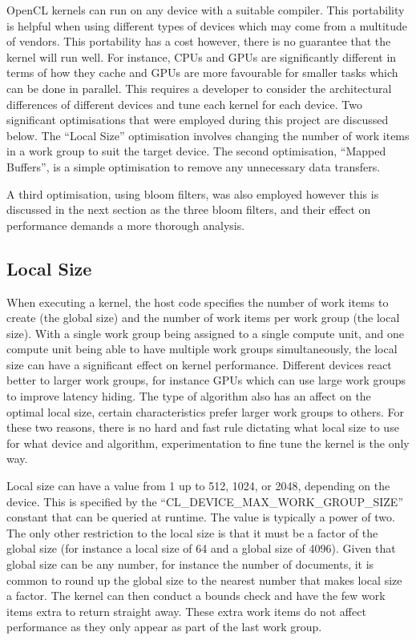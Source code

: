 OpenCL kernels can run on any device with a suitable compiler. This portability
is helpful when using different types of devices which may come from a multitude
of vendors. This portability has a cost however, there is no guarantee that the
kernel will run well. For instance, CPUs and GPUs are significantly different in
terms of how they cache and GPUs are more favourable for smaller tasks which can
be done in parallel. This requires a developer to consider the architectural
differences of different devices and tune each kernel for each device. Two
significant optimisations that were employed during this project are discussed
below. The ``Local Size'' optimisation involves changing the number of work
items in a work group to suit the target device. The second optimisation,
``Mapped Buffers'', is a simple optimisation to remove any unnecessary data
transfers.

A third optimisation, using bloom filters, was also employed however this is
discussed in the next section as the three bloom filters, and their effect on
performance demands a more thorough analysis.

\subsection{Local Size}

When executing a kernel, the host code specifies the number of work items to
create (the global size) and the number of work items per work group (the local
size). With a single work group being assigned to a single compute unit, and one
compute unit being able to have multiple work groups simultaneously, the local
size can have a significant effect on kernel performance. Different devices
react better to larger work groups, for instance GPUs which can use large work
groups to improve latency hiding. The type of algorithm also has an affect on
the optimal local size, certain characteristics prefer larger work groups to
others. For these two reasons, there is no hard and fast rule dictating what
local size to use for what device and algorithm, experimentation to fine tune
the kernel is the only way.

Local size can have a value from 1 up to 512, 1024, or 2048, depending on the
device. This is specified by the ``CL\_DEVICE\_MAX\_WORK\_GROUP\_SIZE'' constant
that can be queried at runtime. The value is typically a power of two. The only
other restriction to the local size is that it must be a factor of the global
size (for instance a local size of 64 and a global size of 4096). Given that
global size can be any number, for instance the number of documents, it is
common to round up the global size to the nearest number that makes local size a
factor. The kernel can then conduct a bounds check and have the few work items
extra to return straight away. These extra work items do not affect performance
as they only appear as part of the last work group.

